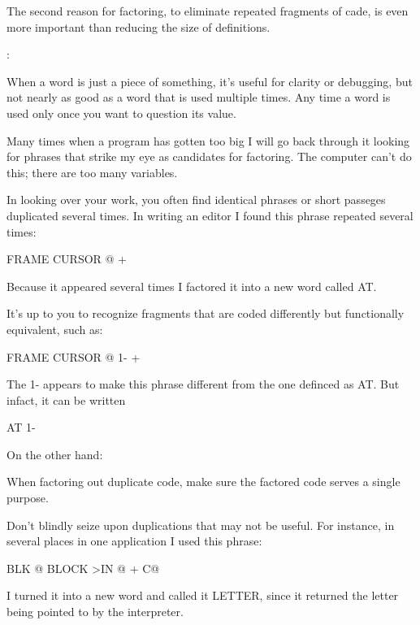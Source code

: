 \begin{tip}
The second reason for factoring, to eliminate repeated fragments of cade, is even more important than reducing the size of definitions.
\end{tip}

\begin{interview}
:

\begin{tfquot}
When a word is just a piece of something, it's useful for clarity or debugging, but not nearly as good as a word that is used multiple times. Any time a word is used only once you want to question its value.

Many times when a program has gotten too big I will go back through it looking for phrases that strike my eye as candidates for factoring. The computer can't do this; there are too many variables.
\end{tfquot}
\end{interview}
In looking over your work, you often find identical phrases or short passeges duplicated several times. In writing an editor I found this phrase repeated several times:

\begin{Code}
FRAME  CURSOR @ +
\end{Code}
Because it appeared several times I factored it into a new word called AT.

It's up to you to recognize fragments that are coded differently but functionally equivalent, such as:

\begin{Code}
FRAME  CURSOR @ 1-  +
\end{Code}
The 1- appears to make this phrase different from the one definced as AT. But infact, it can be written

\begin{Code}
AT 1-
\end{Code}
On the other hand:

\begin{tip}
When factoring out duplicate code, make sure the factored code serves a single purpose.
\end{tip}
Don't blindly seize upon duplications that may not be useful. For instance, in several places in one application I used this phrase:

\begin{Code}
BLK @ BLOCK  >IN @ +  C@
\end{Code}
I turned it into a new word and called it LETTER, since it returned the letter being pointed to by the interpreter.

